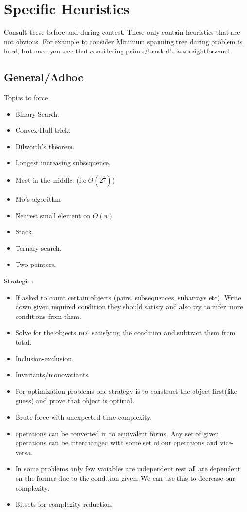 \documentclass[../Notes.tex]{subfiles}
\begin{document}
\chapter{Specific Heuristics}
Consult these before and during contest. These only contain heuristics that are not obvious. For example to consider Minimum spanning tree during problem is hard, but once you saw that considering prim's/kruskal's is straightforward.

\section{General/Adhoc}
Topics to force
\begin{itemize}
	\item Binary Search.
	\item Convex Hull trick.
	\item Dilworth's theorem.
	\item Longest increasing subsequence.
	\item Meet in the middle. (i.e $O(2^{\frac{n}{2}})$)
	\item Mo's algorithm
	\item Nearest small element on $O(n)$
	\item Stack.
	\item Ternary search.
	\item Two pointers.
\end{itemize}

Strategies
\begin{itemize}
	\item If asked to count certain objects (pairs, subsequences, subarrays etc). Write down given required condition they should satisfy and also try to infer more conditions from them.
	\item Solve for the objects \textbf{not} satisfying the condition and subtract them from total.
	\item Inclusion-exclusion.
	\item Invariants/monovariants.
	\item For optimization problems one strategy is to construct the object first(like guess) and prove that object is optimal.
	\item Brute force with unexpected time complexity.
	\item operations can be converted in to equivalent forms. Any set of given operations can be interchanged with some set of our operations and vice-versa.
	\item In some problems only few variables are independent rest all are dependent on the former due to the condition given. We can use this to decrease our complexity.
	\item Bitsets for complexity reduction.
\end{itemize}
\end{document}
